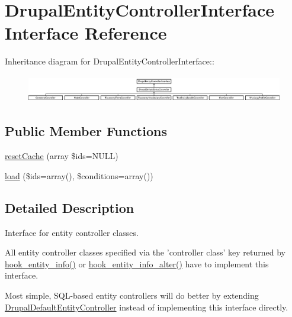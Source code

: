 \hypertarget{interfaceDrupalEntityControllerInterface}{
\section{DrupalEntityControllerInterface Interface Reference}
\label{interfaceDrupalEntityControllerInterface}
}
Inheritance diagram for DrupalEntityControllerInterface::\begin{figure}[H]
\begin{center}
\leavevmode
\includegraphics[height=1.20603cm]{interfaceDrupalEntityControllerInterface}
\end{center}
\end{figure}
\subsection*{Public Member Functions}
\begin{DoxyCompactItemize}
\item 
\hyperlink{interfaceDrupalEntityControllerInterface_ae735484b175ff431b7b104732b7a497b}{resetCache} (array \$ids=NULL)
\item 
\hyperlink{interfaceDrupalEntityControllerInterface_acc6ec97b35f4d32680c0d2ba090f7389}{load} (\$ids=array(), \$conditions=array())
\end{DoxyCompactItemize}


\subsection{Detailed Description}
Interface for entity controller classes.

All entity controller classes specified via the 'controller class' key returned by \hyperlink{group__hooks_gaf02318e9d0e8cdbf6d187b271b9969a8}{hook\_\-entity\_\-info()} or \hyperlink{group__hooks_ga0394a72e4872603e91ce22440195ab45}{hook\_\-entity\_\-info\_\-alter()} have to implement this interface.

Most simple, SQL-\/based entity controllers will do better by extending \hyperlink{classDrupalDefaultEntityController}{DrupalDefaultEntityController} instead of implementing this interface directly. 

